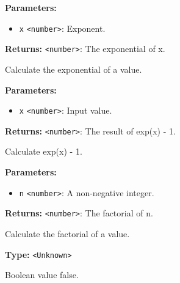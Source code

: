 \documentclass[12pt,a4paper]{article}
\begin{document}
\vspace{5mm}
\noindent {}


\noindent \textbf{Parameters:}
\begin{itemize}
  \item \texttt{x} \texttt{<number>}: Exponent.
\end{itemize}

\noindent \textbf{Returns:} \texttt{<number>}: The exponential of x.

\noindent Calculate the exponential of a value.

\vspace{5mm}
\noindent {}


\noindent \textbf{Parameters:}
\begin{itemize}
  \item \texttt{x} \texttt{<number>}: Input value.
\end{itemize}

\noindent \textbf{Returns:} \texttt{<number>}: The result of exp(x) - 1.

\noindent Calculate exp(x) - 1.

\vspace{5mm}
\noindent {}


\noindent \textbf{Parameters:}
\begin{itemize}
  \item \texttt{n} \texttt{<number>}: A non-negative integer.
\end{itemize}

\noindent \textbf{Returns:} \texttt{<number>}: The factorial of n.

\noindent Calculate the factorial of a value.

\vspace{5mm}
\noindent {}\vspace{4mm}


\noindent \textbf{Type:} \texttt{<Unknown>}

\noindent Boolean value false.

\vspace{5mm}
\noindent {}\vspace{4mm}
\end{document}
